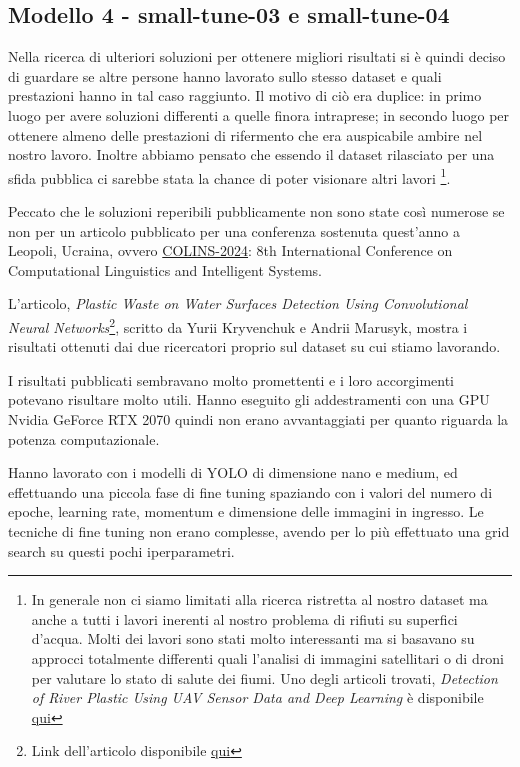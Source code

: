 \subsection*{Modello 4 - small-tune-03 e small-tune-04}


Nella ricerca di ulteriori soluzioni per ottenere migliori risultati si è quindi
deciso di guardare se altre persone hanno lavorato sullo stesso dataset e quali 
prestazioni hanno in tal caso raggiunto. Il motivo di ciò era duplice: in primo
luogo per avere soluzioni differenti a quelle finora intraprese; in secondo 
luogo per ottenere almeno delle prestazioni di rifermento che era auspicabile 
ambire nel nostro lavoro. Inoltre abbiamo pensato che essendo il dataset rilasciato 
per una sfida pubblica ci sarebbe stata la chance di poter visionare altri lavori
\footnote[2]{
In generale non ci siamo limitati alla ricerca ristretta al nostro dataset ma 
anche a tutti i lavori inerenti al nostro problema di rifiuti su superfici d'acqua.
Molti dei lavori sono stati molto interessanti ma si basavano su approcci totalmente
differenti quali l'analisi di immagini satellitari o di droni per valutare lo stato di 
salute dei fiumi. Uno degli articoli trovati, \textit{Detection of River Plastic Using UAV Sensor Data and
Deep Learning} è disponibile
\href{https://doi.org/10.3390/rs14133049}{qui}
}.

Peccato che le soluzioni reperibili pubblicamente non sono state così numerose se 
non per un articolo pubblicato per una conferenza sostenuta quest'anno a Leopoli, 
Ucraina, ovvero \href{https://ceur-ws.org/Vol-3668/}{COLINS-2024}: 8th International Conference on 
Computational Linguistics and Intelligent Systems.

L'articolo, \textit{Plastic Waste on Water Surfaces Detection Using
Convolutional Neural Networks}\footnote[3]{Link dell'articolo disponibile \href{https://ceur-ws.org/Vol-3668/paper13.pdf}{qui}},
 scritto da Yurii Kryvenchuk e Andrii Marusyk,
mostra i risultati ottenuti dai due ricercatori proprio sul dataset su cui stiamo lavorando.

I risultati pubblicati sembravano molto promettenti e i loro accorgimenti potevano risultare molto utili. 
Hanno eseguito gli addestramenti con una GPU Nvidia GeForce RTX 2070 quindi non erano avvantaggiati
per quanto riguarda la potenza computazionale. 

Hanno lavorato con i modelli di YOLO di dimensione nano e medium, ed effettuando una piccola fase di fine 
tuning spaziando con i valori del numero di epoche, learning rate, momentum e dimensione delle immagini in ingresso.
Le tecniche di fine tuning non erano complesse, avendo per lo più effettuato una grid search su questi pochi iperparametri.

